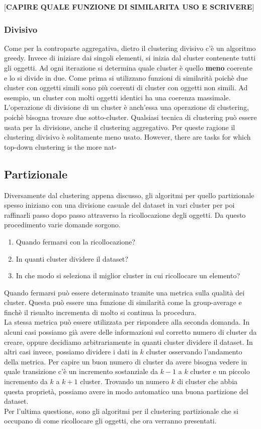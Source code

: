 \documentclass{llncs}
\newcommand{\acapo}{\vspace{0.5\baselineskip}\\}
\begin{document}
	[\textbf{CAPIRE QUALE FUNZIONE DI SIMILARITA USO E SCRIVERE}]

	\subsubsection{Divisivo}
	Come per la controparte aggregativa, dietro il clustering divisivo c'è un algoritmo greedy. Invece di iniziare dai singoli elementi, si inizia dal cluster contenente tutti gli oggetti. Ad ogni iterazione
	si determina quale cluster è quello \textbf{meno} coerente e lo si divide in due. Come prima si utilizzano funzioni di similarità poichè due cluster con oggetti simili sono più coerenti
	di cluster con oggetti non simili. Ad esempio, un cluster con molti oggetti identici ha una coerenza massimale. L'operazione di divisione di un cluster è anch'essa una operazione di clustering, poichè bisogna trovare
	due sotto-cluster. Qualsiasi tecnica di clustering può essere usata per la divisione, anche il clustering aggregativo. Per queste ragione il clustering divisivo è solitamente meno usato.
	However, there are tasks for which top-down clustering is the more nat-
	
	\subsection{Partizionale}
	Diversamente dal clustering appena discusso, gli algoritmi per quello partizionale spesso
	iniziano con una divisione casuale del dataset in vari cluster per poi raffinarli passo dopo passo attraverso 
	la ricollocazione degli oggetti. Da questo procedimento varie domande sorgono. 
	\begin{enumerate}
		\item Quando fermarsi con la ricollocazione?
		\item In quanti cluster dividere il dataset?
		\item In che modo si seleziona il miglior cluster in cui ricollocare un elemento?
	\end{enumerate} 
	Quando fermarsi può essere determinato tramite una metrica sulla qualità dei cluster. Questa può essere una funzione 
	di similarità come la group-average e finchè il risualto incrementa di molto si continua la procedura.
	\acapo
	La stessa metrica può essere utilizzata per rispondere alla seconda domanda. In alcuni casi possiamo già avere
	delle informazioni sul corretto numero di cluster da creare, oppure decidiamo arbitrariamente in quanti cluster dividere il dataset.
	In altri casi invece, possiamo dividere i dati in $k$ cluster osservando l'andamento della metrica.
	Per capire un buon numero di cluster da avere bisogna vedere in quale transizione c'è un 
	incremento sostanziale da $k-1$ a $k$ cluster e un piccolo incremento da $k$ a $k+1$ cluster.
	Trovando un numero $k$ di cluster che abbia questa proprietà, possiamo avere in modo automatico una buona partizione del dataset.
	\acapo
	Per l'ultima questione, sono gli algoritmi per il clustering partizionale che si occupano di come ricollocare gli oggetti, che ora verranno 
	presentati.
\end{document}
